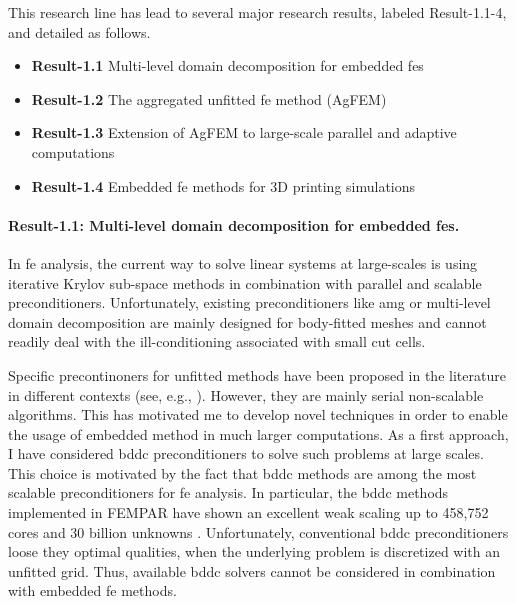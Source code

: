 \documentclass{article}
\begin{document}
This research line has lead to several major research results, labeled Result-1.1-4, and detailed as follows.

\begin{itemize}
\item {\bf Result-1.1}  Multi-level domain decomposition for embedded \acp{fe}
\item {\bf Result-1.2} The aggregated unfitted \ac{fe} method (AgFEM)
\item {\bf Result-1.3} Extension of AgFEM to large-scale parallel and adaptive computations
\item {\bf Result-1.4} Embedded \ac{fe} methods for 3D printing simulations
\end{itemize}

\paragraph{Result-1.1: Multi-level domain decomposition for embedded \acp{fe}.} \label{sec:unf-BDDC}


In \ac{fe} analysis, the current way to solve linear systems at large-scales is using iterative Krylov sub-space methods in combination with parallel and scalable preconditioners. Unfortunately, existing preconditioners like \ac{amg} \cite{Briggs2000} or multi-level domain decomposition \cite{Toselli2005} are mainly designed for body-fitted meshes and cannot readily deal with the ill-conditioning associated with small cut cells. 

Specific precontinoners for unfitted methods have been proposed in the literature in different contexts (see, e.g., \cite{berger-vergiat_inexact_2012,DePrenter2017,hiriyur_quasi-algebraic_2012,menk_robust_2011} ). However, they are mainly serial non-scalable algorithms.  This has motivated me to develop novel techniques in order to enable the usage of embedded method in much larger computations. As a first approach, I have considered \ac{bddc} preconditioners to solve such problems at large scales. This choice is motivated by the fact that \ac{bddc} methods are among the most scalable preconditioners for \ac{fe} analysis. In particular, the \ac{bddc} methods implemented in FEMPAR \cite{badia_fempar:_2017} have shown an excellent weak scaling up to 458,752 cores and 30 billion unknowns \cite{badia_multilevel_2016}. Unfortunately, conventional \ac{bddc} preconditioners loose they optimal qualities, when the underlying problem is discretized with an unfitted grid. Thus, available \ac{bddc} solvers cannot be considered in combination with embedded \ac{fe} methods. 
\end{document}
